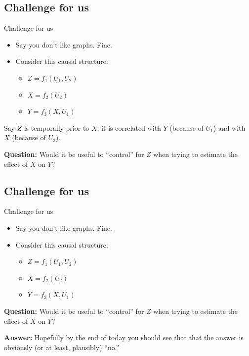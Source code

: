 \documentclass[
  11pt,
  ignorenonframetext,
]{beamer}
\providecommand{\tightlist}{%
  \setlength{\itemsep}{0pt}\setlength{\parskip}{0pt}}\usepackage{longtable,booktabs,array}
\begin{document}
\hypertarget{challenge-for-us}{%
\subsection{Challenge for us}\label{challenge-for-us}}

\begin{frame}{Challenge for us}
\begin{itemize}
\item
  Say you don't like graphs. Fine.\\
\item
  Consider this causal structure:

  \begin{itemize}
  \tightlist
  \item
    \(Z = f_1(U_1, U_2)\)
  \item
    \(X = f_2(U_2)\)
  \item
    \(Y = f_3(X, U_1)\)
  \end{itemize}
\end{itemize}

Say \(Z\) is temporally prior to \(X\); it is correlated with \(Y\)
(because of \(U_1\)) and with \(X\) (because of \(U_2\)).

\textbf{Question:} Would it be useful to ``control'' for \(Z\) when
trying to estimate the effect of \(X\) on \(Y\)?
\end{frame}

\hypertarget{challenge-for-us-1}{%
\subsection{Challenge for us}\label{challenge-for-us-1}}

\begin{frame}{Challenge for us}
\begin{itemize}
\item
  Say you don't like graphs. Fine.\\
\item
  Consider this causal structure:

  \begin{itemize}
  \tightlist
  \item
    \(Z = f_1(U_1, U_2)\)
  \item
    \(X = f_2(U_2)\)
  \item
    \(Y = f_3(X, U_1)\)
  \end{itemize}
\end{itemize}

\textbf{Question:} Would it be useful to ``control'' for \(Z\) when
trying to estimate the effect of \(X\) on \(Y\)?

\textbf{Answer:} Hopefully by the end of today you should see that that
the answer is obviously (or at least, plausibly) ``no.''
\end{frame}
\end{document}
